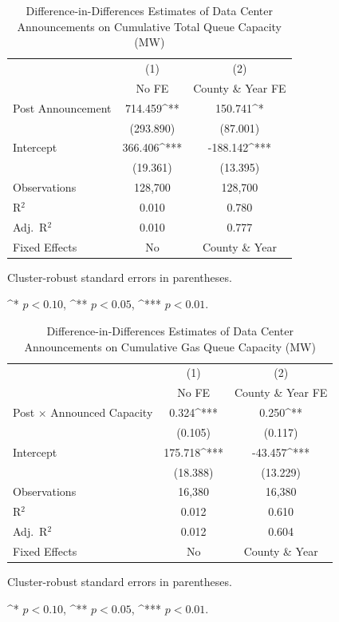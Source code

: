 \documentclass[sigconf,authordraft]{acmart}
\newcommand{\sym}[1]{^{#1}}
\begin{document}
\begin{table}[htbp]\centering
\caption{Difference-in-Differences Estimates of Data Center Announcements on Cumulative Total Queue Capacity (MW)}
\begin{threeparttable}
\begin{tabular}{lcc}
\toprule
& (1) & (2) \\
& No FE & County \& Year FE \\
\midrule
Post Announcement & 714.459\sym{**} & 150.741\sym{*} \\
& (293.890) & (87.001) \\
Intercept & 366.406\sym{***} & -188.142\sym{***} \\
& (19.361) & (13.395) \\
\midrule
Observations & 128,700 & 128,700 \\
R$^2$ & 0.010 & 0.780 \\
Adj.\ R$^2$ & 0.010 & 0.777 \\
Fixed Effects & No & County \& Year \\
\bottomrule
\end{tabular}
\begin{tablenotes}[flushleft]
\footnotesize
\item Cluster-robust standard errors in parentheses. 
\item \sym{*} $p<0.10$, \sym{**} $p<0.05$, \sym{***} $p<0.01$. 
\end{tablenotes}
\end{threeparttable}
\label{DIDTotal}
\end{table}

\begin{table}[htbp]\centering
\caption{Difference-in-Differences Estimates of Data Center Announcements on Cumulative Gas Queue Capacity (MW)}
\begin{threeparttable}
\begin{tabular}{lcc}
\toprule
& (1) & (2) \\
& No FE & County \& Year FE \\
\midrule
Post $\times$ Announced Capacity & 0.324\sym{***} & 0.250\sym{**} \\
& (0.105) & (0.117) \\
Intercept & 175.718\sym{***} & -43.457\sym{***} \\
& (18.388) & (13.229) \\
\midrule
Observations & 16,380 & 16,380 \\
R$^2$ & 0.012 & 0.610 \\
Adj.\ R$^2$ & 0.012 & 0.604 \\
Fixed Effects & No & County \& Year \\
\bottomrule
\end{tabular}
\begin{tablenotes}[flushleft]
\footnotesize
\item Cluster-robust standard errors in parentheses. 
\item \sym{*} $p<0.10$, \sym{**} $p<0.05$, \sym{***} $p<0.01$. 
\end{tablenotes}
\end{threeparttable}
\label{DIDGas}
\end{table}
\end{document}
